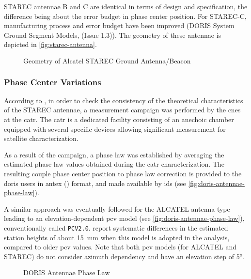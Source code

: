 STAREC antennae B and C are identical in terms of design and specification, the
difference being about the error budget in phase center position. For STAREC-C,
manufacturing process and error budget have been improved (DORIS System Ground Segment Models, (Issue 1.3)). The geometry
of these antennae is depicted in \autoref{fig:starec-antenna}.

\begin{figure}
  \centering
  
  \caption{Geometry of Alcatel STAREC Ground Antenna/Beacon}
  \label{fig:starec-antenna}
\end{figure}

\subsubsection{Phase Center Variations}\label{sssec:doris-pcv}
According to \cite{Tourain2016}, in order to check the consistency of the theoretical 
characteristics of the STAREC antennae, a measurement campaign was performed by 
the \gls{cnes} at the \gls{catr}. The \gls{catr} is a dedicated facility 
consisting of an anechoic chamber equipped with several specific devices 
allowing significant measurement for satellite characterization.

As a result of the campaign, a phase law was established by averaging the 
estimated phase law values obtained during the \gls{catr} characterization. 
The resulting couple phase center position to phase law correction is provided 
to the \gls{doris} users in \gls{antex} (\cite{ANTEXv14}) format, and 
made available by \gls{ids} (see \autoref{fig:doris-antennae-phase-law}).

A similar approach was eventually followed for the ALCATEL antenna type 
leading to an elevation-dependent \gls{pcv} model (see \autoref{fig:doris-antennae-phase-law}), 
conventionally called \texttt{PCV2.0}. \cite{Stepanek2022b} report systematic differences in 
the estimated station heights of about \SI{15}{\milli\meter} when this model is 
adopted in the analysis, compared to older \gls{pcv} values. Note that both 
\gls{pcv} models (for ALCATEL and STAREC) do not consider azimuth dependency 
and have an elevation step of \ang{5}.

\begin{figure}
  \centering
  
  \caption{DORIS Antennae Phase Law}
  \label{fig:doris-antennae-phase-law}
\end{figure}
